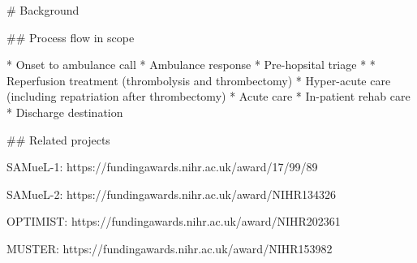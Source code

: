 \begin{markdown}
# Background

## Process flow in scope

* Onset to ambulance call
* Ambulance response
* Pre-hopsital triage
* * Reperfusion treatment (thrombolysis and thrombectomy)
* Hyper-acute care (including repatriation after thrombectomy)
* Acute care
* In-patient rehab care
* Discharge destination


## Related projects

SAMueL-1:
https://fundingawards.nihr.ac.uk/award/17/99/89

SAMueL-2:
https://fundingawards.nihr.ac.uk/award/NIHR134326

OPTIMIST:
https://fundingawards.nihr.ac.uk/award/NIHR202361

MUSTER:
https://fundingawards.nihr.ac.uk/award/NIHR153982    
\end{markdown}
